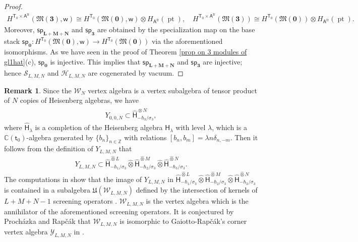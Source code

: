 \documentclass[10pt]{amsart}
\theoremstyle{definition}
\newtheorem{Remark}[Theorem]{Remark}
\numberwithin{equation}{section}
\newcommand{\bC}{\mathbb{C}}
\newcommand{\bZ}{\mathbb{Z}}
\newcommand{\cH}{\mathcal{H}}
\newcommand{\cS}{\mathcal{S}}
\newcommand{\cW}{\mathcal{W}}
\newcommand{\fM}{\mathfrak{M}}
\newcommand{\sA}{\mathsf{A}}
\newcommand{\sT}{\mathsf{T}}
\newcommand{\sw}{\mathsf{w}}
\newcommand{\pt}{\operatorname{pt}}
\begin{document}
\begin{proof}
\begin{equation*}
\begin{gathered}
H^{\sT_0\times \sA^{\mathrm{fr}}}(\fM(\mathbf 3),\sw)\cong H^{\sT_0}(\fM(\mathbf 0),\sw)\otimes H_{\sA^{\mathrm{fr}}}(\pt),\quad H^{\sT_0\times \sA^{\mathrm{fr}}}(\fM(\mathbf 3))\cong H^{\sT_0}(\fM(\mathbf 0))\otimes H_{\sA^{\mathrm{fr}}}(\pt).
\end{gathered}
\end{equation*}
Moreover, $\mathsf{sp}_{\mathbf L+\mathbf M+\mathbf N}$ and $\mathsf{sp}_{\mathbf 3}$ are obtained by the specialization map on the base stack $\mathsf{sp}_{\mathbf 0}\colon H^{\sT_0}(\fM(\mathbf 0),\sw)\to H^{\sT_0}(\fM(\mathbf 0))$ via the aforementioned isomorphisms. As we have seen in the proof of Theorem \ref{prop on 3 modules of gl1hat}(c), $\mathsf{sp}_{\mathbf 0}$ is injective. This implies that $\mathsf{sp}_{\mathbf L+\mathbf M+\mathbf N}$ and $\mathsf{sp}_{\mathbf 3}$ are injective; hence $\cS_{L,M,N}$ and $\cH_{L,M,N}$ are cogenerated by vacuum.
\end{proof}


\begin{Remark}
Since the $\cW_N$ vertex algebra is a vertex subalgebra of tensor product of $N$ copies of Heisenberg algebras, we have
\begin{align*}
    Y_{0,0,N}\subset \widehat{\mathsf H}^{\widehat{\otimes} N}_{-\hbar_3/\sigma_3},
\end{align*}
where $\widehat{\mathsf H}_{\lambda}$ is a completion of the Heisenberg algebra $\mathsf H_{\lambda}$ with level $\lambda$, which is a $\bC(\mathsf t_0)$-algebra generated by $\{b_n\}_{n\in \bZ}$ with relations $[b_n,b_m]=\lambda n\delta_{n,-m}$. Then it follows from the definition of $Y_{L,M,N}$ that
\begin{align*}
    Y_{L,M,N}\subset \widehat{\mathsf H}^{\widehat{\otimes} L}_{-\hbar_1/\sigma_3}\widehat{\otimes} \widehat{\mathsf H}^{\widehat{\otimes} M}_{-\hbar_2/\sigma_3}\widehat{\otimes}\widehat{\mathsf H}^{\widehat{\otimes} N}_{-\hbar_3/\sigma_3}.
\end{align*}
The computations in \cite[\S 10]{RSYZ1} show that the image of $Y_{L,M,N}$ in $\widehat{\mathsf H}^{\widehat{\otimes} L}_{-\hbar_1/\sigma_3}\widehat{\otimes} \widehat{\mathsf H}^{\widehat{\otimes} M}_{-\hbar_2/\sigma_3}\widehat{\otimes}\widehat{\mathsf H}^{\widehat{\otimes} N}_{-\hbar_3/\sigma_3}$ is contained in a subalgebra $\mathfrak{U}(\cW_{L,M,N})$ defined by the intersection of kernels of $L+M+N-1$ screening operators \cite[\S 9]{RSYZ1}. $\cW_{L,M,N}$ is the vertex algebra which is the annihilator of the aforementioned screening operators. It is conjectured by Proch\'azka and Rap\v{c}\'ak \cite{PR} that $\cW_{L,M,N}$ is isomorphic to Gaiotto-Rap\v{c}\'ak's corner vertex algebra $\mathcal Y_{L,M,N}$ in \cite{GR}.
\end{Remark}
\end{document}
